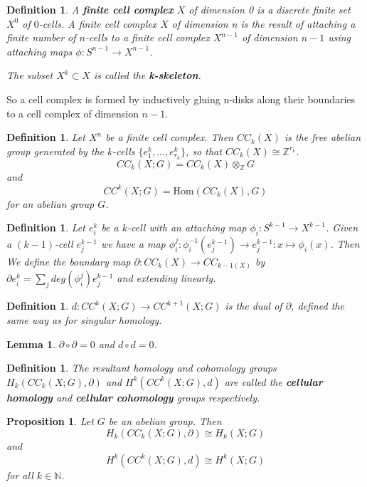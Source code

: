 \documentclass{article}
\newtheorem{definition}[theorem]{Definition}
\newtheorem{lemma}[theorem]{Lemma}
\newtheorem{proposition}[theorem]{Proposition}
\begin{document}
\begin{definition}
A \textbf{finite cell complex} $X$ of dimension 0 is a discrete finite set $X^0$ of $0$-cells. A finite cell complex $X$ of dimension n is the result of attaching a finite number of $n$-cells to a finite cell complex $X^{n-1}$ of dimension $n-1$ using attaching maps $\phi\colon S^{n-1}\to X^{n-1}$.

\noindent The subset $X^k\subset X$ is called the \textbf{k-skeleton}.
\end{definition}

\noindent So a cell complex is formed by inductively gluing n-disks along their boundaries to a cell complex of dimension $n-1$.

\begin{definition}
Let $X^n$ be a finite cell complex. Then $CC_k(X)$ is the free abelian group generated by the $k$-cells $\{e^k_1,...,e^k_{r_k}\}$, so that $CC_k(X)\cong\mathbb{Z}^{r_k}$. \[CC_k(X;G)=CC_k(X)\otimes_\mathbb{Z}G\] and \[CC^k(X;G)=\text{Hom}(CC_k(X),G)\]for an abelian group $G$.
\end{definition}

\begin{definition}
Let $e_i^k$ be a $k$-cell with an attaching map $\phi_i\colon S^{k-1}\to X^{k-1}$. Given a $(k-1)$-cell $e_j^{k-1}$ we have a map $\phi_i^j:\phi_i^{-1}(e_j^{k-1})\to e_j^{k-1}:x\mapsto\phi_i(x)$. Then We define the boundary map $\partial\colon CC_k(X)\to CC_{k-1(X)}$ by $\partial e_i^k=\sum_jdeg(\phi_i^j)e_j^{k-1}$ and extending linearly.
\end{definition}

\begin{definition}
$d\colon CC^k(X;G)\to CC^{k+1}(X;G)$ is the dual of $\partial$, defined the same way as for singular homology.
\end{definition}

\begin{lemma}
$\partial\circ\partial=0$ and $d\circ d=0$.
\end{lemma}

\begin{definition}
The resultant homology and cohomology groups $H_k(CC_k(X;G),\partial)$ and $H^k(CC^k(X;G),d)$ are called the \textbf{cellular homology} and \textbf{cellular cohomology} groups respectively.
\end{definition}

\begin{proposition}
Let $G$ be an abelian group. Then\[H_k(CC_k(X;G),\partial)\cong H_k(X;G)\] and \[H^k(CC^k(X;G),d)\cong H^k(X;G)\] for all $k\in\mathbb{N}$.
\end{proposition}
\end{document}
